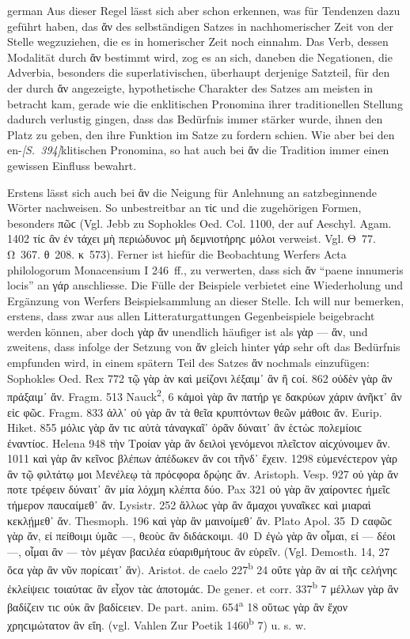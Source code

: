 \begin{otherlanguage*}{german}
Aus dieser Regel lässt sich aber schon erkennen, was für Tendenzen dazu geführt haben, das ἄν des selbständigen Satzes in nachhomerischer Zeit von der Stelle wegzuziehen, die es in homerischer Zeit noch einnahm. Das Verb, dessen Modalität durch ἄν bestimmt wird, zog es an sich, daneben die Negationen, die Adverbia, besonders die superlativischen, überhaupt derjenige Satzteil, für den der durch ἄν angezeigte, hypothetische Charakter des Satzes am meisten in betracht kam, gerade wie die enklitischen Pronomina ihrer traditionellen Stellung dadurch verlustig gingen, dass das Bedürfnis immer stärker wurde, ihnen den Platz zu geben, den ihre Funktion im Satze zu fordern schien. Wie aber bei den en-\hypertarget{p394}{\emph{[S.~394]}}\label{p394}klitischen Pronomina, so hat auch bei ἄν die Tradition immer einen gewissen Einfluss bewahrt.

Erstens lässt sich auch bei ἄν die Neigung für Anlehnung an satzbeginnende Wörter nachweisen. So unbestreitbar an τίϲ und die zugehörigen Formen, besonders πῶϲ (Vgl. Jebb zu Sophokles Oed. Col. 1100, der auf Aeschyl. Agam. 1402 τίϲ ἂν ἐν τάχει μὴ περιώδυνοϲ μὴ δεμνιοτήρηϲ μόλοι verweist. Vgl. Θ~77. Ω~367. θ~208. κ~573). Ferner ist hiefür die Beobachtung Werfers Acta philologorum Monacensium I 246~ff., zu verwerten, dass sich ἄν “paene innumeris locis” an γάρ anschliesse. Die Fülle der Beispiele verbietet eine Wiederholung und Ergänzung von Werfers Beispielsammlung an dieser Stelle. Ich will nur bemerken, erstens, dass zwar aus allen Litteraturgattungen Gegenbeispiele beigebracht werden können, aber doch γὰρ ἄν unendlich häufiger ist als γὰρ — ἄν, und zweitens, dass infolge der Setzung von ἄν gleich hinter γάρ sehr oft das Bedürfnis empfunden wird, in einem spätern Teil des Satzes ἄν nochmals einzufügen: Sophokles Oed. Rex 772 τῷ γὰρ ὰν καὶ μείζονι λέξαιμ᾽ ἂν ἢ ϲοί. 862 οὐδὲν γὰρ ἂν πράξαιμ᾽ ἄν. Fragm. 513 Nauck\textsuperscript{2}, 6 κἀμοὶ γὰρ ἂν πατήρ γε δακρύων χάριν ἀνῆκτ᾽ ἂν εἰϲ φῶϲ. Fragm. 833 ἀλλ᾽ οὐ γὰρ ἂν τὰ θεῖα κρυπτόντων θεῶν μάθοιϲ ἄν. Eurip. Hiket. 855 μόλιϲ γὰρ ἄν τιϲ αὐτὰ τἀναγκαῖ᾽ ὁρᾶν δύναιτ᾽ ἂν ἑϲτὼϲ πολεμίοιϲ ἐναντίοϲ. Helena 948 τὴν Τροίαν γὰρ ἂν δειλοὶ γενόμενοι πλεῖϲτον αἰϲχύνοιμεν ἄν. 1011 καὶ γὰρ ἂν κεῖνοϲ βλέπων ἀπέδωκεν ἄν ϲοι τῆνδ᾽ ἔχειν. 1298 εὐμενέϲτερον γὰρ ἂν τῷ φιλτάτῳ μοι Μενέλεῳ τὰ πρόϲφορα δρῴηϲ ἄν. Aristoph. Vesp. 927 οὐ γὰρ ἄν ποτε τρέφειν δύναιτ᾽ ἂν μία λόχμη κλέπτα δύο. Pax 321 οὐ γὰρ ἂν χαίροντεϲ ἡμεῖϲ τήμερον παυϲαίμεθ᾽ ἄν. Lysistr. 252 ἄλλωϲ γὰρ ἂν ἄμαχοι γυναῖκεϲ καὶ μιαραὶ κεκλῄμεθ᾽ ἄν. Thesmoph. 196 καὶ γὰρ ἂν μαινοίμεθ᾽ ἄν. Plato Apol. 35~D ϲαφῶϲ γὰρ ἄν, εἰ πείθοιμι ὑμᾶϲ —, θεοὺϲ ἂν διδάϲκοιμι. 40~D ἐγὼ γὰρ ἂν οἶμαι, εἰ — δέοι —, οἶμαι ἂν — τὸν μέγαν βαϲιλέα εὐαριθμήτουϲ ἂν εὑρεῖν. (Vgl. Demosth. 14, 27 ὅϲα γὰρ ἂν νῦν πορίϲαιτ᾽ ἄν). Aristot. de caelo 227\textsuperscript{b} 24 οὔτε γὰρ ἂν αἱ τῆϲ ϲελήνηϲ ἐκλείψειϲ τοιαύταϲ ἂν εἶχον τὰϲ ἀποτομάϲ. De gener. et corr. 337\textsuperscript{b} 7 μέλλων γὰρ ἂν βαδίζειν τιϲ οὐκ ἂν βαδίϲειεν. De part. anim. 654\textsuperscript{a} 18 οὕτωϲ γὰρ ἂν ἔχον χρηϲιμώτατον ἂν εἴη. (vgl. Vahlen Zur Poetik 1460\textsuperscript{b} 7) u. s. w.


\end{otherlanguage*}
